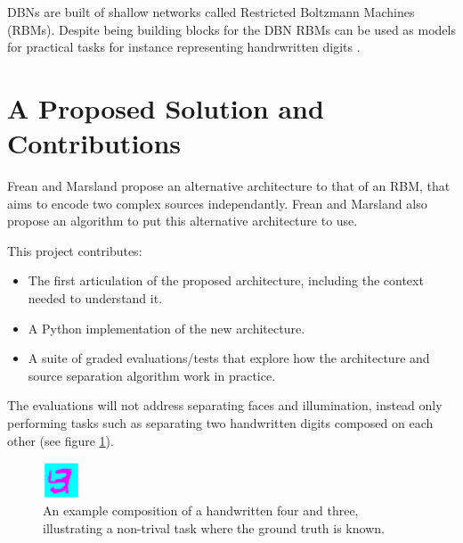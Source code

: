 DBNs are built of shallow networks called Restricted Boltzmann Machines (RBMs). Despite being building blocks for the DBN RBMs can be used as models for practical tasks for instance representing handrwritten digits \cite{fischer2014training}.

\section{A Proposed Solution and Contributions}

Frean and Marsland propose an alternative architecture to that of an RBM, that aims to encode two complex sources independantly. Frean and Marsland also propose an algorithm to put this alternative architecture to use.

This project contributes:
\begin{itemize}
  \item The first articulation of the proposed architecture, including the context needed to understand it.
  \item A Python implementation of the new architecture.
  \item A suite of graded evaluations/tests that explore how the architecture and source separation algorithm work in practice.
\end{itemize}
The evaluations will not address separating faces and illumination, instead only performing tasks such as separating two handwritten digits composed on each other (see figure \ref{F:Composition-Example}).

\begin{figure}[h]
\begin{center}
  \includegraphics[width = 0.1\textwidth]{Assets/composition-example.png}
\caption{An example composition of a handwritten four and three, illustrating a non-trival task where the ground truth is known.}
\label{F:Composition-Example}
\end{center}
\end{figure}


